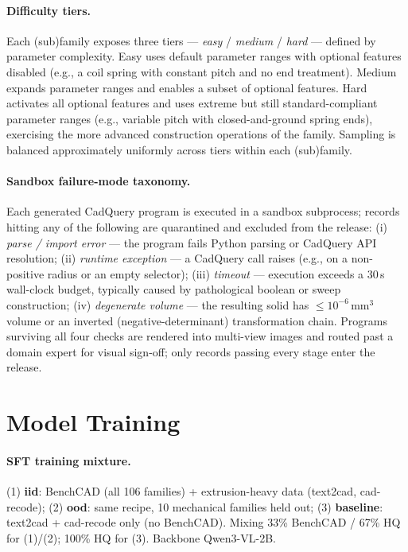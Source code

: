 \paragraph{Difficulty tiers.} Each (sub)family exposes three tiers --- \emph{easy} / \emph{medium} / \emph{hard} --- defined by parameter complexity. Easy uses default parameter ranges with optional features disabled (e.g., a coil spring with constant pitch and no end treatment). Medium expands parameter ranges and enables a subset of optional features. Hard activates all optional features and uses extreme but still standard-compliant parameter ranges (e.g., variable pitch with closed-and-ground spring ends), exercising the more advanced construction operations of the family. Sampling is balanced approximately uniformly across tiers within each (sub)family.

\paragraph{Sandbox failure-mode taxonomy.} Each generated CadQuery program is executed in a sandbox subprocess; records hitting any of the following are quarantined and excluded from the release: (i) \emph{parse / import error} --- the program fails Python parsing or CadQuery API resolution; (ii) \emph{runtime exception} --- a CadQuery call raises (e.g., on a non-positive radius or an empty selector); (iii) \emph{timeout} --- execution exceeds a 30\,s wall-clock budget, typically caused by pathological boolean or sweep construction; (iv) \emph{degenerate volume} --- the resulting solid has $\leq 10^{-6}$\,mm$^3$ volume or an inverted (negative-determinant) transformation chain. Programs surviving all four checks are rendered into multi-view images and routed past a domain expert for visual sign-off; only records passing every stage enter the release.


\section{Model Training}
\label{app:training}
\paragraph{SFT training mixture.}
(1) \textbf{iid}: BenchCAD (all 106 families) + extrusion-heavy data (text2cad, cad-recode);
(2) \textbf{ood}: same recipe, 10 mechanical families held out;
(3) \textbf{baseline}: text2cad + cad-recode only (no BenchCAD).
Mixing 33\% BenchCAD / 67\% HQ for (1)/(2); 100\% HQ for (3). Backbone Qwen3-VL-2B.

